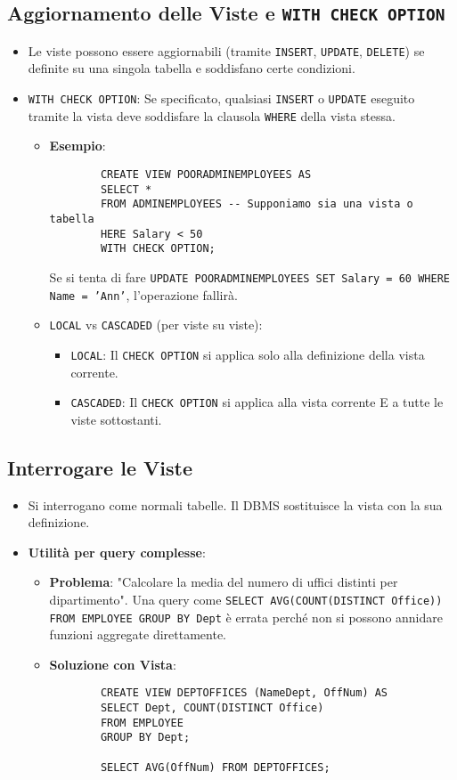 \documentclass{article}
\begin{document}
	\subsection{Aggiornamento delle Viste e \texttt{WITH CHECK OPTION}}
	\begin{itemize}
		\item Le viste possono essere aggiornabili (tramite \texttt{INSERT}, \texttt{UPDATE}, \texttt{DELETE}) se definite su una singola tabella e soddisfano certe condizioni.
		\item \texttt{WITH CHECK OPTION}: Se specificato, qualsiasi \texttt{INSERT} o \texttt{UPDATE} eseguito tramite la vista deve soddisfare la clausola \texttt{WHERE} della vista stessa.
		\begin{itemize}
			\item \textbf{Esempio}:
			\begin{verbatim}
		CREATE VIEW POORADMINEMPLOYEES AS
		SELECT *
		FROM ADMINEMPLOYEES -- Supponiamo sia una vista o tabella
		HERE Salary < 50
		WITH CHECK OPTION;
			\end{verbatim}
			Se si tenta di fare \texttt{UPDATE POORADMINEMPLOYEES SET Salary = 60 WHERE Name = 'Ann'}, l'operazione fallirà.
			\item \texttt{LOCAL} vs \texttt{CASCADED} (per viste su viste):
			\begin{itemize}
				\item \texttt{LOCAL}: Il \texttt{CHECK OPTION} si applica solo alla definizione della vista corrente.
				\item \texttt{CASCADED}: Il \texttt{CHECK OPTION} si applica alla vista corrente E a tutte le viste sottostanti.
			\end{itemize}
		\end{itemize}
	\end{itemize}
	
	\subsection{Interrogare le Viste}
	\begin{itemize}
		\item Si interrogano come normali tabelle. Il DBMS sostituisce la vista con la sua definizione.
		\item \textbf{Utilità per query complesse}:
		\begin{itemize}
			\item \textbf{Problema}: "Calcolare la media del numero di uffici distinti per dipartimento". Una query come \texttt{SELECT AVG(COUNT(DISTINCT Office)) FROM EMPLOYEE GROUP BY Dept} è errata perché non si possono annidare funzioni aggregate direttamente.
			\item \textbf{Soluzione con Vista}:
			\begin{verbatim}
		CREATE VIEW DEPTOFFICES (NameDept, OffNum) AS
		SELECT Dept, COUNT(DISTINCT Office)
		FROM EMPLOYEE
		GROUP BY Dept;
		
		SELECT AVG(OffNum) FROM DEPTOFFICES;
			\end{verbatim}
		\end{itemize}
	\end{itemize}
	
\end{document}
